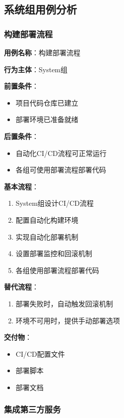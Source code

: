 \documentclass[a4paper,12pt]{article}
\begin{document}
\subsection{系统组用例分析}

\subsubsection{构建部署流程}

\textbf{用例名称}：构建部署流程

\textbf{行为主体}：System组

\textbf{前置条件}：
\begin{itemize}
  \item 项目代码仓库已建立
  \item 部署环境已准备就绪
\end{itemize}

\textbf{后置条件}：
\begin{itemize}
  \item 自动化CI/CD流程可正常运行
  \item 各组可使用部署流程部署代码
\end{itemize}

\textbf{基本流程}：
\begin{enumerate}
  \item System组设计CI/CD流程
  \item 配置自动化构建环境
  \item 实现自动化部署机制
  \item 设置部署监控和回滚机制
  \item 各组使用部署流程部署代码
\end{enumerate}

\textbf{替代流程}：
\begin{enumerate}
  \item 部署失败时，自动触发回滚机制
  \item 环境不可用时，提供手动部署选项
\end{enumerate}

\textbf{交付物}：
\begin{itemize}
  \item CI/CD配置文件
  \item 部署脚本
  \item 部署文档
\end{itemize}

\subsubsection{集成第三方服务}
\end{document}
